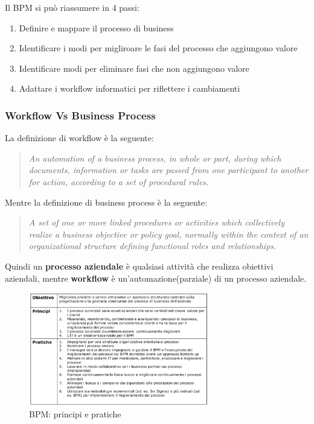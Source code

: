 Il BPM si può riassumere in 4 passi:
\begin{enumerate}
	\item Definire e mappare il processo di business
	\item Identificare i modi per migliroare le fasi del processo che aggiungono valore
	\item Identificare modi per eliminare fasi che non aggiungono valore
	\item Adattare i workflow informatici per riflettere i cambiamenti
\end{enumerate}


\subsubsection{Workflow Vs Business Process}

La definizione di workflow è la seguente:
\begin{quote}
	\textit{
		An automation of a business process, in whole or
		part, during which documents, information or tasks are passed
		from one participant to another for action, according to a set
		of procedural rules.
	}
\end{quote}

Mentre la definizione di business process è la seguente:
\begin{quote}
	\textit{
		A set of one or more linked procedures or
		activities which collectively realize a business objective or
		policy goal, normally within the context of an organizational
		structure defining functional roles and relationships.
	}
\end{quote}

Quindi un \textbf{processo aziendale} è qualsiasi attività che realizza obiettivi aziendali,
mentre \textbf{workflow} è un'automazione(parziale) di un processo aziendale.


\begin{figure}[!ht]
	\centering
	\includegraphics[width=0.7\textwidth]{./images/bpm_principi_pratiche.png}
	\caption{BPM: principi e pratiche}
	\label{fig:bpm_principi_pratiche}
\end{figure}


